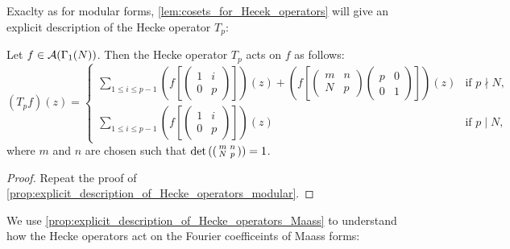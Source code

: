       Exaclty as for modular forms, \cref{lem:cosets_for_Hecek_operators} will give an explicit description of the Hecke operator $T_{p}$:

      \begin{proposition}\label{prop:explicit_description_of_Hecke_operators_Maass}
        Let $f \in \mathcal{A}(\Gamma_{1}(N))$. Then the Hecke operator $T_{p}$ acts on $f$ as follows:
        \[
          (T_{p}f)(z) = \begin{cases} \displaystyle\sum_{1 \le i \le p-1}\left(f\left[\begin{pmatrix} 1 & i \\ 0 & p \end{pmatrix}\right]\right)(z)+\left(f\left[\begin{pmatrix} m & n \\ N & p \end{pmatrix}\begin{pmatrix} p & 0 \\ 0 & 1 \end{pmatrix}\right]\right)(z) & \text{if $p \nmid N$}, \\ \displaystyle\sum_{1 \le i \le p-1}\left(f\left[\begin{pmatrix} 1 & i \\ 0 & p \end{pmatrix}\right]\right)(z) & \text{if $p \mid N$}, \end{cases}
        \]
        where $m$ and $n$ are chosen such that $\det\left(\begin{psmallmatrix} m & n \\ N & p \end{psmallmatrix}\right) = 1$.
      \end{proposition}
      \begin{proof}
        Repeat the proof of \cref{prop:explicit_description_of_Hecke_operators_modular}.
      \end{proof}

      We use \cref{prop:explicit_description_of_Hecke_operators_Maass} to understand how the Hecke operators act on the Fourier coefficeints of Maass forms:

